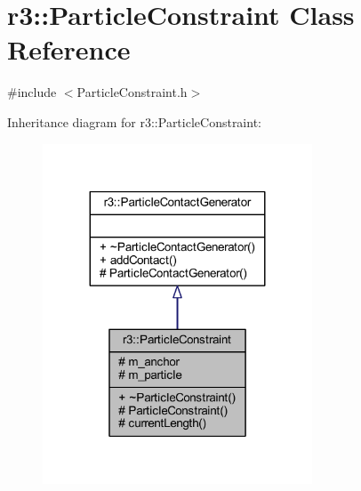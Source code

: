 \hypertarget{classr3_1_1_particle_constraint}{}\section{r3\+:\+:Particle\+Constraint Class Reference}
\label{classr3_1_1_particle_constraint}


{\ttfamily \#include $<$Particle\+Constraint.\+h$>$}



Inheritance diagram for r3\+:\+:Particle\+Constraint\+:\nopagebreak
\begin{figure}[H]
\begin{center}
\leavevmode
\includegraphics[width=227pt]{classr3_1_1_particle_constraint__inherit__graph}
\end{center}
\end{figure}


